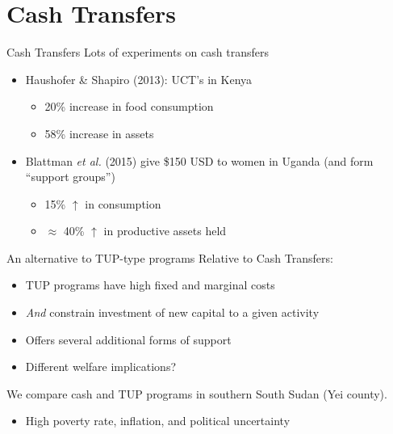 \documentclass[t,presentation]{beamer}
\begin{document}
\section*{Cash Transfers}
\label{sec:orgheadline6}
\begin{frame}[label={sec:orgheadline4}]{Cash Transfers}
Lots of experiments on cash transfers

\begin{itemize}
\item \alert{Haushofer \& Shapiro (2013):} UCT's in Kenya

\begin{itemize}
\item 20\% increase in food consumption
\item 58\% increase in assets
\end{itemize}
\item \alert{Blattman \emph{et al.} (2015)} give \$150 USD to women in Uganda (and form ``support groups'')

\begin{itemize}
\item 15\% \(\uparrow\) in consumption
\item \(\approx\) 40\% \(\uparrow\) in productive assets held
\end{itemize}
\end{itemize}
\end{frame}

\begin{frame}[label={sec:orgheadline5}]{An alternative to TUP-type programs}
Relative to Cash Transfers:

\begin{itemize}
\item TUP programs have high fixed \alert{and} marginal costs
\item \emph{And} constrain investment of new capital to a given activity
\item Offers several additional forms of support
\item \alert{Different welfare implications?}
\end{itemize}

We compare cash and TUP programs in southern South Sudan (Yei county).

\begin{itemize}
\item High poverty rate, inflation, and political uncertainty
\end{itemize}
\end{frame}
\end{document}

